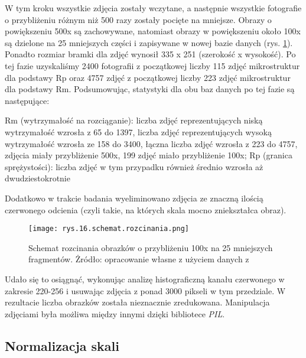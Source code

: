 W tym kroku wszystkie zdjęcia zostały wczytane, a następnie wszystkie fotografie o przybliżeniu różnym niż 500 razy zostały pocięte na mniejsze. Obrazy o powiększeniu 500x są zachowywane, natomiast obrazy w powiększeniu około 100x są dzielone na 25 mniejszych części i zapisywane w nowej bazie danych (rys. \ref{fig:mesh16}). Ponadto rozmiar bramki dla zdjęć wynosił 335 x 251 (szerokość x  wysokość). Po tej fazie uzyskaliśmy 2400 fotografii z początkowej liczby 115 zdjęć mikrostruktur dla podstawy Rp oraz 4757 zdjęć z początkowej liczby 223 zdjęć mikrostruktur dla podstawy Rm. Podsumowując, statystyki dla obu baz danych po tej fazie są następujące:
\begin{outline}
	\1 Rm (wytrzymałość na rozciąganie):
		\2 liczba zdjęć reprezentujących niską wytrzymałość wzrosła z 65 do 1397,
		\2 liczba zdjęć reprezentujących wysoką wytrzymałość wzrosła ze 158 do 3400,
		\2 łączna liczba zdjęć wzrosła z 223 do 4757,
		 zdjęcia miały przybliżenie 500x, 199 zdjęć miało przybliżenie 100x;
	\1 Rp (granica sprężystości):
		\2 liczba zdjęć w tym przypadku również średnio wzrosła aż dwudziestokrotnie
\end{outline}
Dodatkowo w trakcie badania wyeliminowano zdjęcia ze znaczną ilością czerwonego odcienia (czyli takie, na których skala mocno zniekształca obraz).
\begin{figure}[h]
    \centering
    \texttt{[image: rys.16.schemat.rozcinania.png]}
    \caption{Schemat rozcinania obrazków o przybliżeniu 100x na 25 mniejszych fragmentów. Żródło: opracowanie własne z użyciem danych z \cite{Pirowski17}}
    \label{fig:mesh16}
\end{figure}
Udało się to osiągnąć, wykonując analizę histograficzną kanału czerwonego w zakresie 220-256 i usuwając zdjęcia z ponad 3000 pikseli w tym przedziale. W rezultacie liczba obrazków została nieznacznie zredukowana. Manipulacja zdjęciami była możliwa między innymi dzięki bibliotece \textit{PIL}.


\subsection{Normalizacja skali}
\label{sec:normalizacja_skali}

